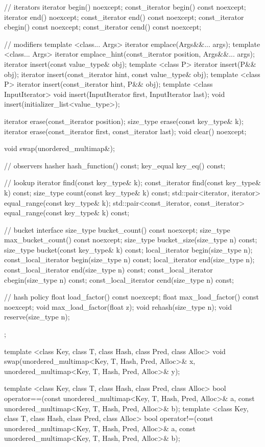\begin{codeblock}
{{    // iterators
    iterator       begin() noexcept;
    const_iterator begin() const noexcept;
    iterator       end() noexcept;
    const_iterator end() const noexcept;
    const_iterator cbegin() const noexcept;
    const_iterator cend() const noexcept;

    // modifiers
    template <class... Args> iterator emplace(Args&&... args);
    template <class... Args> iterator emplace_hint(const_iterator position, Args&&... args);
    iterator insert(const value_type& obj);
    template <class P> iterator insert(P&& obj);
    iterator insert(const_iterator hint, const value_type& obj);
    template <class P> iterator insert(const_iterator hint, P&& obj);
    template <class InputIterator> void insert(InputIterator first, InputIterator last);
    void insert(initializer_list<value_type>);

    iterator erase(const_iterator position);
    size_type erase(const key_type& k);
    iterator erase(const_iterator first, const_iterator last);
    void clear() noexcept;

    void swap(unordered_multimap&);

    // observers
    hasher hash_function() const;
    key_equal key_eq() const;

    // lookup
    iterator       find(const key_type& k);
    const_iterator find(const key_type& k) const;
    size_type count(const key_type& k) const;
    std::pair<iterator, iterator>             equal_range(const key_type& k);
    std::pair<const_iterator, const_iterator> equal_range(const key_type& k) const;

    // bucket interface
    size_type bucket_count() const noexcept;
    size_type max_bucket_count() const noexcept;
    size_type bucket_size(size_type n) const;
    size_type bucket(const key_type& k) const;
    local_iterator begin(size_type n);
    const_local_iterator begin(size_type n) const;
    local_iterator end(size_type n);
    const_local_iterator end(size_type n) const;
    const_local_iterator cbegin(size_type n) const;
    const_local_iterator cend(size_type n) const;

    // hash policy
    float load_factor() const noexcept;
    float max_load_factor() const noexcept;
    void max_load_factor(float z);
    void rehash(size_type n);
    void reserve(size_type n);
  };

  template <class Key, class T, class Hash, class Pred, class Alloc>
    void swap(unordered_multimap<Key, T, Hash, Pred, Alloc>& x,
              unordered_multimap<Key, T, Hash, Pred, Alloc>& y);

  template <class Key, class T, class Hash, class Pred, class Alloc>
    bool operator==(const unordered_multimap<Key, T, Hash, Pred, Alloc>& a,
                    const unordered_multimap<Key, T, Hash, Pred, Alloc>& b);
  template <class Key, class T, class Hash, class Pred, class Alloc>
    bool operator!=(const unordered_multimap<Key, T, Hash, Pred, Alloc>& a,
                    const unordered_multimap<Key, T, Hash, Pred, Alloc>& b);
}
\end{codeblock}

